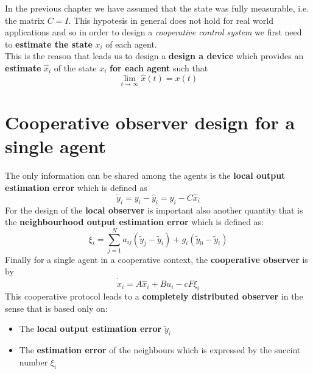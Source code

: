 In the previous chapter we have assumed that the state was fully measurable, i.e. the matrix $C=I$. This hypotesis in general does not hold for real world applications and so in order to design a \textit{cooperative control system} we first need to \textbf{estimate the state} $x_i$ of each agent. \\
This is the reason that leads us to design a \textbf{design a device} which provides an \textbf{estimate} $\hat{x}_i$ of the state $x_i$ \textbf{for each agent} such that 
\begin{equation}
    \lim_{t \to \infty} \hat{x}(t) = x(t)
\end{equation}

\section{Cooperative observer design for a single agent}
The only information can be shared among the agents is the \textbf{local output estimation error} which is defined as
\begin{equation}
    \tilde{y}_i = y_i - \hat{y}_i = y_i - C \hat{x}_i 
\end{equation}
For the design of the \textbf{local observer} is important also another quantity that is the \textbf{neighbourhood output estimation error} which is defined as: 
{\large
    \begin{equation}
        \xi_i = \sum_{j=1}^N {a_{ij} (\tilde{y}_j - \tilde{y}_i) + g_i(\tilde{y}_0 - \tilde{y}_i)}
    \end{equation}
}
Finally for a single agent in a cooperative context, the \textbf{cooperative observer} is by 
\begin{equation} \label{eq: coop_OBSV}
    \dot{\hat{x}}_i = A \hat{x}_i + B u_i - cF\xi_i
\end{equation}
This cooperative protocol leads to a \textbf{completely distributed observer} in the sense that is based only on: 
\begin{itemize}
    \item The \textbf{local output estimation error} $\tilde{y}_i$
    \item The \textbf{estimation error} of the neighbours which is expressed by the succint number $\xi_i$
\end{itemize} 

